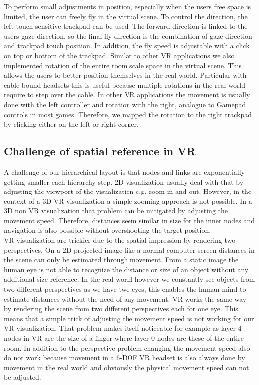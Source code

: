 To perform small adjustments in position, especially when the users free space is limited, the user can freely fly in the virtual scene. To control the direction, the left touch sensitive trackpad can be used. 
The forward direction is linked to the users gaze direction, so the final fly direction is the combination of gaze direction and trackpad touch position. 
In addition, the fly speed is adjustable with a click on top or bottom of the trackpad.    
Similar to other VR applications we also implemented rotation of the entire room scale space in the virtual scene. This allows the users to better position themselves in the real world. 
Particular with cable bound headsets this is useful because multiple rotations in the real world require to step over the cable. In other VR applications the movement is usually done with the left controller and rotation with the right, analogue to Gamepad controls in most games. Therefore, we mapped the rotation to the right trackpad by clicking either on the left or right corner.

\subsection{Challenge of spatial reference in VR}
\label{chap:ps-spatialReference}
A challenge of our hierarchical layout is that nodes and links are exponentially getting smaller each hierarchy step. 
2D visualization usually deal with that by adjusting the viewport of the visualization e.g. zoom in and out. 
However, in the context of a 3D VR visualization a simple zooming approach is not possible. 
In a 3D non VR visualization that problem can be mitigated by adjusting the movement speed. Therefore, distances seem similar in size for the inner nodes and navigation is also possible without overshooting the target position.\\ 
VR visualization are trickier due to the spatial impression by rendering two perspectives. On a 2D projected image like a normal computer screen distances in the scene can only be estimated through movement. From a static image the human eye is not able to recognize the distance or size of an object without any additional size reference. 
In the real world however we constantly see objects from two different perspectives as we have two eyes, this enables the human mind to estimate distances without the need of any movement. VR works the same way by rendering the scene from two different perspectives each for one eye.  
This means that a simple trick of adjusting the movement speed is not working for our VR visualization. 
That problem makes itself noticeable for example as layer 4 nodes in VR are the size of a finger where layer 0 nodes are these of the entire room.
In addition to the perspective problem changing the movement speed also do not work because movement in a 6-DOF VR headset is also always done by movement in the real world and obviously the physical movement speed can not be adjusted.

